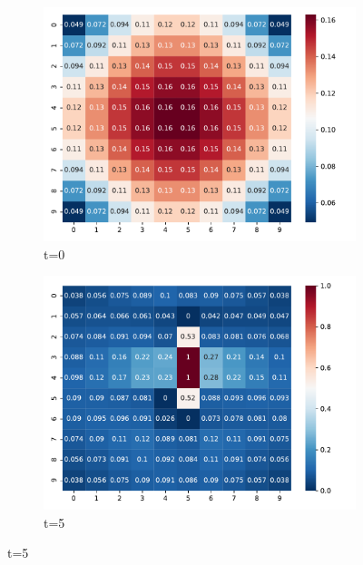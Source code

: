 \begin{figure}
    \centering
    \begin{subfigure}{0.35\textwidth}
        \includegraphics[scale=0.4]{figure/pmatrix/0.pdf}
        \caption{t=0}
    \end{subfigure}
    \begin{subfigure}{0.35\textwidth}
        \includegraphics[scale=0.4]{figure/pmatrix/5.pdf}
        \caption{t=5}
    \end{subfigure}
    

\end{figure}
